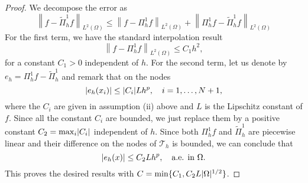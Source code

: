 \documentclass{siamart1116}
\numberwithin{theorem}{section}
\DeclarePairedDelimiter{\abs}{\lvert}{\rvert}
\newcommand{\norm}[1]{\left\lVert#1\right\rVert}
\newcommand{\Tau}{\mathcal{T}}
\begin{document}
\begin{proof} We decompose the error as
	\begin{equation*}
		\norm{f - \widetilde \Pi_h^1f}_{L^2(\Omega)} \leq \norm{f - \Pi_h^1f}_{L^2(\Omega)} + \norm{\Pi_h^1f - \widetilde \Pi_h^1f}_{L^2(\Omega)}
	\end{equation*}
	For the first term, we have the standard interpolation result
	\begin{equation}
		\norm{f - \Pi_h^1f}_{L^2(\Omega)} \leq C_1h^2,
	\end{equation}
	for a constant $C_1 > 0$ independent of $h$. For the second term, let us denote by $e_h = \Pi_h^1f - \widetilde \Pi_h^1$ and remark that on the nodes
	\begin{equation*}
		\abs{e_h(x_i)} \leq \abs{C_i} L h^p, \quad i = 1, \ldots, N+1,
	\end{equation*}
	where the $C_i$ are given in assumption (ii) above and $L$ is the Lipschitz constant of $f$. Since all the constant $C_i$ are bounded, we just replace them by a positive constant $C_2 = \max_{i} \abs{C_i}$ independent of $h$. Since both $\Pi_h^1 f$ and $\widetilde \Pi_h^1$ are piecewise linear and their difference on the nodes of $\Tau_h$ is bounded, we can conclude that
	\begin{equation*}
		\abs{e_h(x)} \leq C_2 L h^p, \quad \text{a.e. in } \Omega.
	\end{equation*}
	This proves the desired results with $C = \min\{C_1, C_2 L\abs{\Omega}^{1/2}\}$.
\end{proof}
\end{document}
